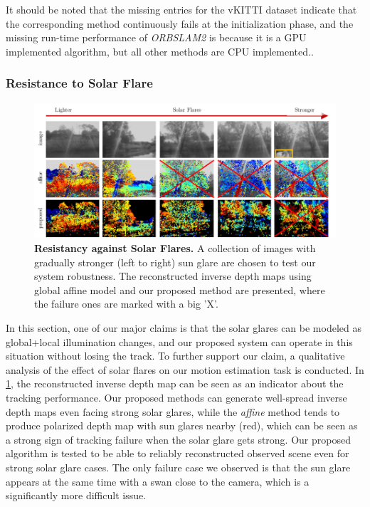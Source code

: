 It should be noted that the missing entries for the vKITTI dataset indicate that the corresponding method continuously fails at the initialization phase, and the missing run-time performance of {\em ORBSLAM2} is because it is a GPU implemented algorithm, but all other methods are CPU implemented.. 

\subsubsection{Resistance to Solar Flare}
\label{sssec:resistance}

\begin{figure}[t] 
  	\centering
  	\includegraphics[width=\linewidth]{figures/illumination/direct_sun_glare.pdf}
	\caption[Resistancy against Solar Flares]{ \textbf{Resistancy against Solar Flares.} A collection of images with gradually stronger (left to right) sun glare are chosen to test our system robustness. The reconstructed inverse depth maps using global affine model and our proposed method are presented, where the failure ones are marked with a big 'X'.
	\label{fig:illumination_solar}}
\end{figure}

In this section, one of our major claims is that the solar glares can be modeled as global+local illumination changes, and our proposed system can operate in this situation without losing the track. To further support our claim, a qualitative analysis of the effect of solar flares on our motion estimation task is conducted. In \ref{fig:illumination_solar}, the reconstructed inverse depth map can be seen as an indicator about the tracking performance. Our proposed methods can generate well-spread inverse depth maps even facing strong solar glares, while the {\em affine} method tends to produce polarized depth map with sun glares nearby (red), which can be seen as a strong sign of tracking failure when the solar glare gets strong. Our proposed algorithm is tested to be able to reliably reconstructed observed scene even for strong solar glare cases. The only failure case we observed is that the sun glare appears at the same time with a swan close to the camera, which is a significantly more difficult issue. 

